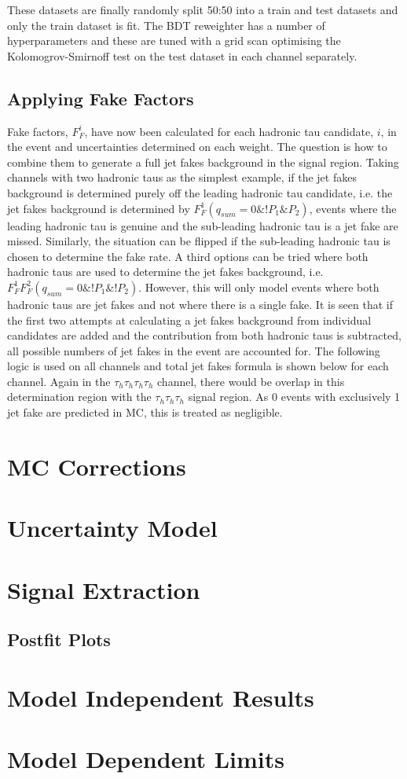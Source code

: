 These datasets are finally randomly split 50:50 into a train and test datasets and only the train dataset is fit. The BDT reweighter has a number of hyperparameters and these are tuned with a grid scan optimising the Kolomogrov-Smirnoff test on the test dataset in each channel separately.

\subsection{Applying Fake Factors}

Fake factors, $F_{F}^{i}$, have now been calculated for each hadronic tau candidate, $i$, in the event and uncertainties determined on each weight. 
The question is how to combine them to generate a full jet fakes background in the signal region. 
Taking channels with two hadronic taus as the simplest example, if the jet fakes background is determined purely off the leading hadronic tau candidate, i.e. the jet fakes background is determined by $F_{F}^{1}  (q_{sum}=0 \& !P_{1} \& P_{2})$, events where the leading hadronic tau is genuine and the sub-leading hadronic tau is a jet fake are missed. 
Similarly, the situation can be flipped if the sub-leading hadronic tau is chosen to determine the fake rate. 
A third options can be tried where both hadronic taus are used to determine the jet fakes background, i.e. $F_{F}^{1}  F_{F}^{2}  (q_{sum}=0 \& !P_{1} \& !P_{2})$. 
However, this will only model events where both hadronic taus are jet fakes and not where there is a single fake. 
It is seen that if the first two attempts at calculating a jet fakes background from individual candidates are added and the contribution from both hadronic taus is subtracted, all possible numbers of jet fakes in the event are accounted for. 
The following logic is used on all channels and total jet fakes formula is shown below for each channel. 
Again in the $\tau_h \tau_h \tau_h \tau_h$ channel, there would be overlap in this determination region with the $\tau_h \tau_h \tau_h$ signal region. 
As 0 events with exclusively 1 jet fake are predicted in MC, this is treated as negligible.

\section{MC Corrections}
\section{Uncertainty Model}
\section{Signal Extraction}
\subsection{Postfit Plots}
\section{Model Independent Results}
\section{Model Dependent Limits}